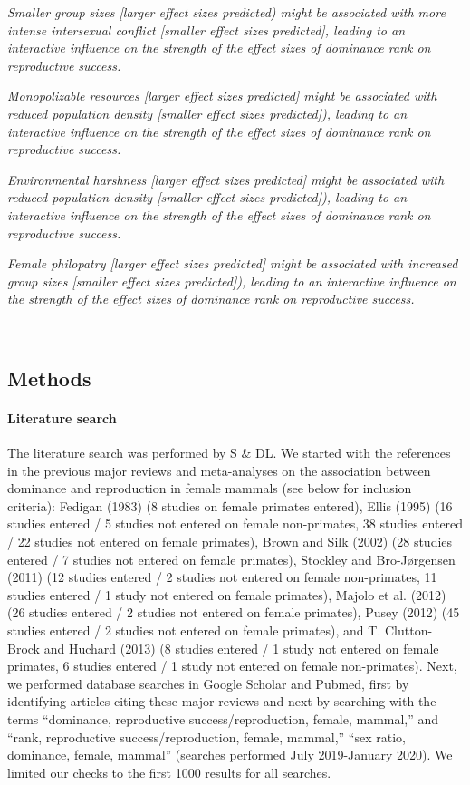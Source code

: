 \documentclass[
]{article}
\begin{document}
\emph{Smaller group sizes {[}larger effect sizes predicted) might be
associated with more intense intersexual conflict {[}smaller effect
sizes predicted{]}, leading to an interactive influence on the strength
of the effect sizes of dominance rank on reproductive success.}

\emph{Monopolizable resources {[}larger effect sizes predicted{]} might
be associated with reduced population density {[}smaller effect sizes
predicted{]}), leading to an interactive influence on the strength of
the effect sizes of dominance rank on reproductive success.}

\emph{Environmental harshness {[}larger effect sizes predicted{]} might
be associated with reduced population density {[}smaller effect sizes
predicted{]}), leading to an interactive influence on the strength of
the effect sizes of dominance rank on reproductive success.}

\emph{Female philopatry {[}larger effect sizes predicted{]} might be
associated with increased group sizes {[}smaller effect sizes
predicted{]}), leading to an interactive influence on the strength of
the effect sizes of dominance rank on reproductive success.}

~

\hypertarget{methods}{%
\subsection{Methods}\label{methods}}

\hypertarget{literature-search}{%
\paragraph{\texorpdfstring{\textbf{Literature
search}}{Literature search}}\label{literature-search}}

The literature search was performed by S \& DL. We started with the
references in the previous major reviews and meta-analyses on the
association between dominance and reproduction in female mammals (see
below for inclusion criteria): Fedigan (1983) (8 studies on female
primates entered), Ellis (1995) (16 studies entered / 5 studies not
entered on female non-primates, 38 studies entered / 22 studies not
entered on female primates), Brown and Silk (2002) (28 studies entered /
7 studies not entered on female primates), Stockley and Bro-Jørgensen
(2011) (12 studies entered / 2 studies not entered on female
non-primates, 11 studies entered / 1 study not entered on female
primates), Majolo et al. (2012) (26 studies entered / 2 studies not
entered on female primates), Pusey (2012) (45 studies entered / 2
studies not entered on female primates), and T. Clutton-Brock and
Huchard (2013) (8 studies entered / 1 study not entered on female
primates, 6 studies entered / 1 study not entered on female
non-primates). Next, we performed database searches in Google Scholar
and Pubmed, first by identifying articles citing these major reviews and
next by searching with the terms ``dominance, reproductive
success/reproduction, female, mammal,'' and ``rank, reproductive
success/reproduction, female, mammal,'' ``sex ratio, dominance, female,
mammal'' (searches performed July 2019-January 2020). We limited our
checks to the first 1000 results for all searches.
\end{document}
